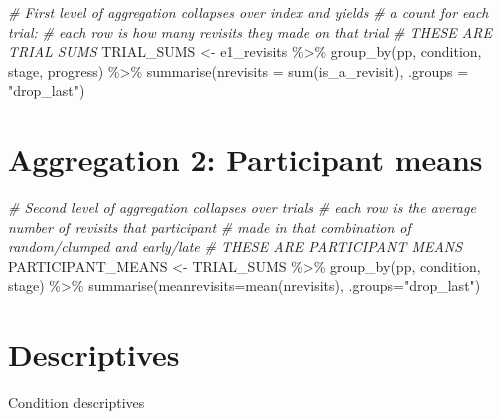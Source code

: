 \documentclass[
]{book}
\newenvironment{Shaded}{\begin{snugshade}}{\end{snugshade}}
\newcommand{\AttributeTok}[1]{\textcolor[rgb]{0.77,0.63,0.00}{#1}}
\newcommand{\CommentTok}[1]{\textcolor[rgb]{0.56,0.35,0.01}{\textit{#1}}}
\newcommand{\FunctionTok}[1]{\textcolor[rgb]{0.00,0.00,0.00}{#1}}
\newcommand{\NormalTok}[1]{#1}
\newcommand{\OtherTok}[1]{\textcolor[rgb]{0.56,0.35,0.01}{#1}}
\newcommand{\SpecialCharTok}[1]{\textcolor[rgb]{0.00,0.00,0.00}{#1}}
\newcommand{\StringTok}[1]{\textcolor[rgb]{0.31,0.60,0.02}{#1}}
\begin{document}
\begin{Shaded}
\begin{Highlighting}[]
\CommentTok{\# First level of aggregation collapses over index and yields }
\CommentTok{\# a count for each trial: }
\CommentTok{\# each row is how many revisits they made on that trial}
\CommentTok{\# THESE ARE TRIAL SUMS}
\NormalTok{TRIAL\_SUMS }\OtherTok{\textless{}{-}}
\NormalTok{  e1\_revisits }\SpecialCharTok{\%\textgreater{}\%} 
  \FunctionTok{group\_by}\NormalTok{(pp, condition, stage, progress) }\SpecialCharTok{\%\textgreater{}\%} 
  \FunctionTok{summarise}\NormalTok{(}\AttributeTok{nrevisits =} \FunctionTok{sum}\NormalTok{(is\_a\_revisit), }\AttributeTok{.groups =} \StringTok{"drop\_last"}\NormalTok{)}
\end{Highlighting}
\end{Shaded}

\hypertarget{aggregation-2-participant-means}{%
\section{Aggregation 2: Participant means}\label{aggregation-2-participant-means}}

\begin{Shaded}
\begin{Highlighting}[]
\CommentTok{\# Second level of aggregation collapses over trials}
\CommentTok{\# each row is the average number of revisits that participant }
\CommentTok{\# made in that combination of random/clumped and early/late}
\CommentTok{\# THESE ARE PARTICIPANT MEANS}
\NormalTok{PARTICIPANT\_MEANS }\OtherTok{\textless{}{-}} 
\NormalTok{  TRIAL\_SUMS }\SpecialCharTok{\%\textgreater{}\%} 
  \FunctionTok{group\_by}\NormalTok{(pp, condition, stage) }\SpecialCharTok{\%\textgreater{}\%} 
  \FunctionTok{summarise}\NormalTok{(}\AttributeTok{meanrevisits=}\FunctionTok{mean}\NormalTok{(nrevisits), }\AttributeTok{.groups=}\StringTok{"drop\_last"}\NormalTok{)}
\end{Highlighting}
\end{Shaded}

\hypertarget{descriptives}{%
\section{Descriptives}\label{descriptives}}

Condition descriptives
\end{document}
